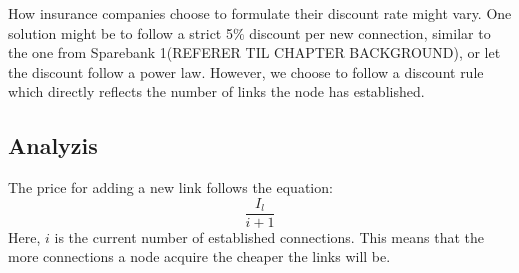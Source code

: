 How insurance companies choose to formulate their discount rate might vary. One solution might be to follow a strict 5$\%$ discount per new connection, similar to the one from Sparebank 1(REFERER TIL CHAPTER BACKGROUND), or let the discount follow a power law. However, we choose to follow a discount rule which directly reflects the number of links the node has established. 
\subsection{Analyzis}
The price for adding a new link follows the equation:
\begin{equation}
\frac{I_{l}}{i+1}
\label{eq:discount0}
\end{equation}
Here, $i$ is the current number of established connections. This means that the more connections a node acquire the cheaper the links will be. 
